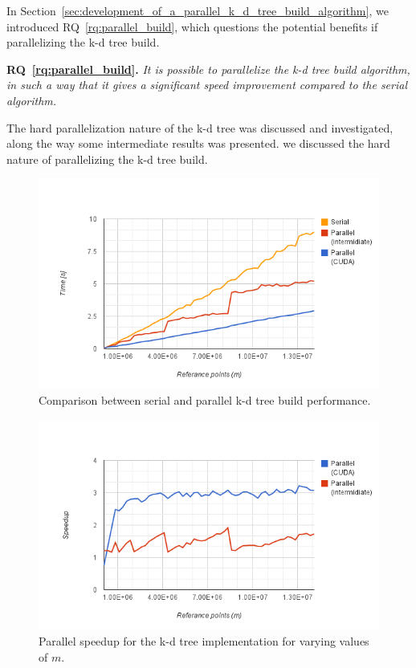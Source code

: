 
In Section~\ref{sec:development_of_a_parallel_k_d_tree_build_algorithm}, we introduced RQ~\ref{rq:parallel_build}, which questions the potential benefits if parallelizing the k-d tree build.   


\textbf{RQ~\ref{rq:parallel_build}.} \emph{It is possible to parallelize the k-d tree build algorithm, in such a way that it gives a significant speed improvement compared to the serial algorithm.}

The hard parallelization nature of the k-d tree was discussed and investigated, along the way some intermediate results was presented. 
we discussed the hard nature of parallelizing the k-d tree build. 


\begin{figure}[ht]
    \centering
    \includegraphics[width=120mm]{../gfx/final_tree_build.png}
    \caption{Comparison between serial and parallel k-d tree build performance.}
    \label{fig:final_tree_build}
\end{figure}

\begin{figure}[ht]
    \centering
    \includegraphics[width=120mm]{../gfx/final_tree_build_speedup.png}
    \caption{Parallel speedup for the k-d tree implementation for varying values of $m$.}
    \label{fig:final_tree_build_speedup}
\end{figure}



